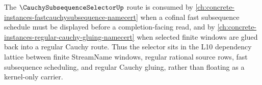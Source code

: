 The $\CauchySubsequenceSelectorUp$ route is consumed by \autoref{ch:concrete-instances-fastcauchysubsequence-namecert} when a cofinal fast subsequence schedule must be displayed before a completion-facing read, and by \autoref{ch:concrete-instances-regular-cauchy-gluing-namecert} when selected finite windows are glued back into a regular Cauchy route. Thus the selector sits in the L10 dependency lattice between finite StreamName windows, regular rational source rows, fast subsequence scheduling, and regular Cauchy gluing, rather than floating as a kernel-only carrier.

